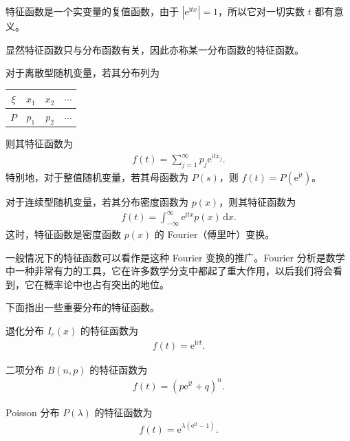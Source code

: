 \documentclass[../../main.tex]{subfiles}
\begin{document}
特征函数是一个实变量的复值函数，由于 $|\mathrm{e}^{\mathrm{i}tx}|=1$，所以它对一切实数 $t$ 都有意义。

显然特征函数只与分布函数有关，因此亦称某一分布函数的特征函数。

对于离散型随机变量，若其分布列为
\begin{center}
\begin{tabular}{c|ccc}
$\xi$ & $x_1$ & $x_2$ & $\cdots$\\
\hline
$P$ & $p_1$ & $p_2$ & $\cdots$
\end{tabular}
\end{center}
则其特征函数为
\begin{align}
f(t)=\sum_{j=1}^{\infty}p_j\mathrm{e}^{\mathrm{i}t x_j}.\label{align:ch04-离散特征函数}
\end{align}
特别地，对于整值随机变量，若其母函数为 $P(s)$，则 $f(t)=P(\mathrm{e}^{\mathrm{i}t})$。

对于连续型随机变量，若其分布密度函数为 $p(x)$，则其特征函数为
\begin{align}
f(t)=\int_{-\infty}^{\infty}\mathrm{e}^{\mathrm{i}tx}p(x)\,\mathrm{d}x.\label{align:ch04-连续特征函数}
\end{align}
这时，特征函数是密度函数 $p(x)$ 的 Fourier（傅里叶）变换。

一般情况下的特征函数可以看作是这种 Fourier 变换的推广。Fourier 分析是数学中一种非常有力的工具，它在许多数学分支中都起了重大作用，以后我们将会看到，它在概率论中也占有突出的地位。

下面指出一些重要分布的特征函数。

\begin{example}[退化分布]\label{example:ch04-退化特征函数}
退化分布 $I_c(x)$ 的特征函数为
\begin{align}
f(t)=\mathrm{e}^{\mathrm{i}ct}.\label{align:ch04-退化特征函数}
\end{align}
\end{example}

\begin{example}[二项分布]\label{example:ch04-二项特征函数}
二项分布 $B(n,p)$ 的特征函数为
\begin{align}
f(t)=(p\mathrm{e}^{\mathrm{i}t}+q)^n.\label{align:ch04-二项特征函数}
\end{align}
\end{example}

\begin{example}[Poisson 分布]\label{example:ch04-Poisson特征函数}
Poisson 分布 $P(\lambda)$ 的特征函数为
\begin{align}
f(t)=\mathrm{e}^{\lambda(\mathrm{e}^{\mathrm{i}t}-1)}.\label{align:ch04-Poisson特征函数}
\end{align}
\end{example}
\end{document}
